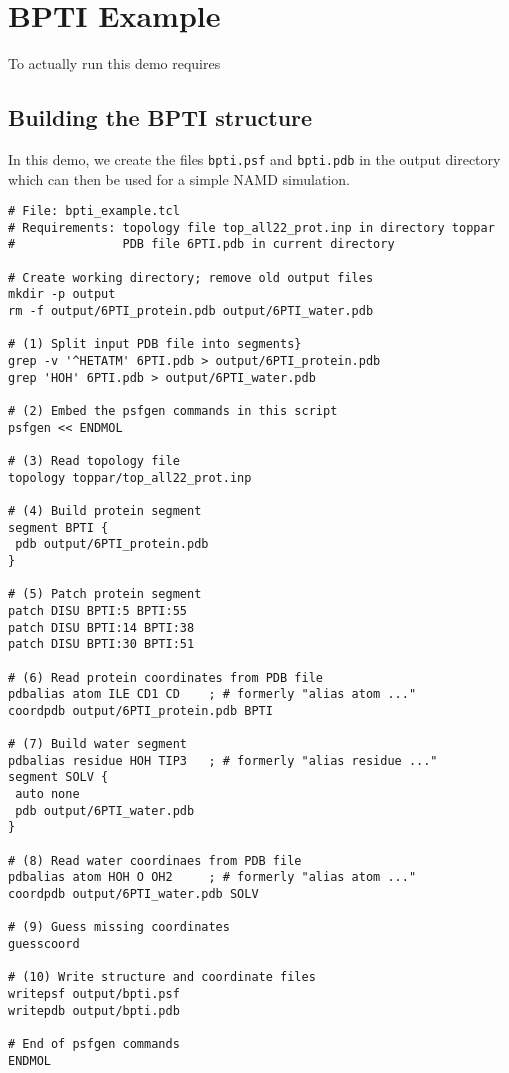 \section{BPTI Example}

To actually run this demo requires

\subsection*{Building the BPTI structure}
In this demo, we create the files \verb#bpti.psf# and \verb#bpti.pdb#
in the output directory which can then be used for a simple NAMD
simulation.  

\begin{verbatim}
# File: bpti_example.tcl
# Requirements: topology file top_all22_prot.inp in directory toppar
#               PDB file 6PTI.pdb in current directory

# Create working directory; remove old output files
mkdir -p output
rm -f output/6PTI_protein.pdb output/6PTI_water.pdb

# (1) Split input PDB file into segments}
grep -v '^HETATM' 6PTI.pdb > output/6PTI_protein.pdb
grep 'HOH' 6PTI.pdb > output/6PTI_water.pdb

# (2) Embed the psfgen commands in this script
psfgen << ENDMOL

# (3) Read topology file
topology toppar/top_all22_prot.inp

# (4) Build protein segment
segment BPTI {
 pdb output/6PTI_protein.pdb
}

# (5) Patch protein segment
patch DISU BPTI:5 BPTI:55
patch DISU BPTI:14 BPTI:38
patch DISU BPTI:30 BPTI:51

# (6) Read protein coordinates from PDB file
pdbalias atom ILE CD1 CD    ; # formerly "alias atom ..."
coordpdb output/6PTI_protein.pdb BPTI

# (7) Build water segment
pdbalias residue HOH TIP3   ; # formerly "alias residue ..."
segment SOLV {
 auto none
 pdb output/6PTI_water.pdb
}

# (8) Read water coordinaes from PDB file
pdbalias atom HOH O OH2     ; # formerly "alias atom ..."
coordpdb output/6PTI_water.pdb SOLV

# (9) Guess missing coordinates
guesscoord

# (10) Write structure and coordinate files
writepsf output/bpti.psf
writepdb output/bpti.pdb

# End of psfgen commands
ENDMOL
\end{verbatim}

